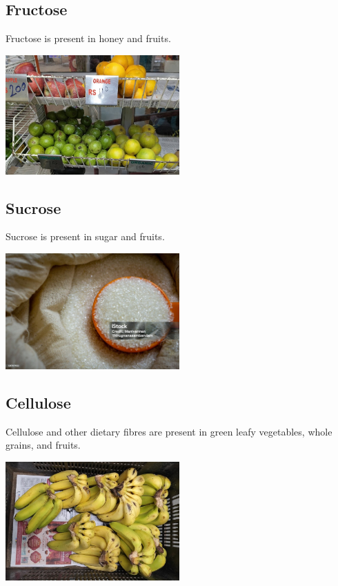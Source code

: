 \documentclass[
]{book}
\begin{document}
\subsection*{Fructose}\label{fructose}

Fructose is present in honey and fruits.

\includegraphics[width=0.5\textwidth,height=\textheight]{Images/Fruit.jpg}

\subsection*{Sucrose}\label{sucrose}

Sucrose is present in sugar and fruits.

\includegraphics[width=0.5\textwidth,height=\textheight]{Images/Sugar.jpg}

\subsection*{Cellulose}\label{cellulose}

Cellulose and other dietary fibres are present in green leafy vegetables, whole grains, and fruits.

\includegraphics[width=0.5\textwidth,height=\textheight]{Images/Fibre.jpg}
\end{document}
